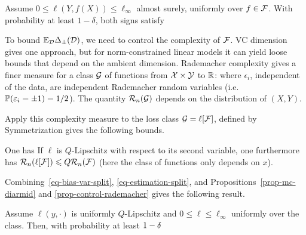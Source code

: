 \begin{prop}\label{prop-mc-diarmid}
Assume $0\leq\ell(Y,f(X))\leq\ell_\infty$ almost surely, uniformly over $f\in\mathcal{F}$. With probability at least $1-\delta$, both signs satisfy
\end{prop}

To bound $\mathbb{E}_{\mathcal{D}}\Delta_\pm(\mathcal{D})$, we need to control the complexity of $\mathcal{F}$. VC dimension gives one approach, but for norm-constrained linear models it can yield loose bounds that depend on the ambient dimension. Rademacher complexity gives a finer measure for a class $\mathcal{G}$ of functions from $\mathcal{X} \times \mathcal{Y}$ to $\mathbb{R}$:
where $\epsilon_i$, independent of the data, are independent Rademacher random variables (i.e. $\mathbb{P}(\varepsilon_i = \pm 1) = 1/2$). The quantity $\mathcal{R}_n(\mathcal{G})$ depends on the distribution of $(X,Y)$.

Apply this complexity measure to the loss class $\mathcal{G} = \ell[\mathcal{F}]$, defined by
Symmetrization gives the following bounds.

\begin{prop}\label{prop-control-rademacher}
	One has
	If $\ell$ is $Q$-Lipschitz with respect to its second variable, one furthermore has $\mathcal{R}_n(\ell[\mathcal{F}]) \leqslant Q \mathcal{R}_n(\mathcal{F})$ (here the class of functions only depends on $x$).
\end{prop}

Combining~\eqref{eq-bias-var-split}, \eqref{eq-estimation-split}, and Propositions~\ref{prop-mc-diarmid} and \ref{prop-control-rademacher} gives the following result.

\begin{thm}
	Assume $\ell(y,\cdot)$ is uniformly $Q$-Lipschitz and $0\leq\ell\leq\ell_\infty$ uniformly over the class. Then, with probability at least $1-\delta$
\end{thm}

